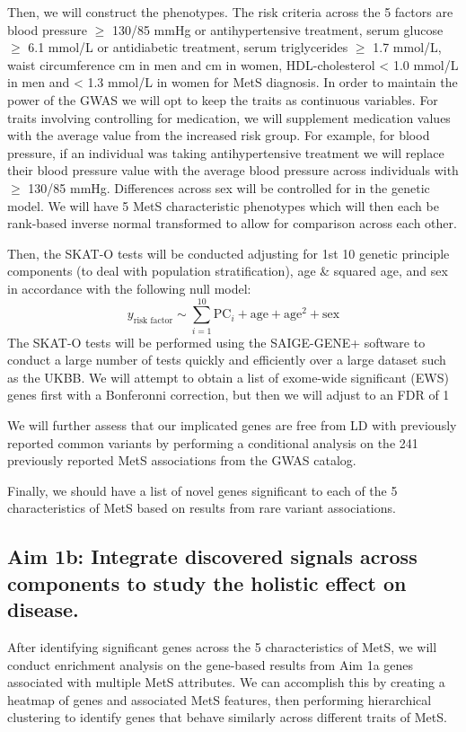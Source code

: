 \documentclass[11pt]{article}
\begin{document}
Then, we will construct the phenotypes. The risk criteria across the 5 factors are blood pressure $\ge$ 130/85 mmHg or antihypertensive treatment, serum glucose $\ge$ 6.1 mmol/L or antidiabetic treatment, serum triglycerides $\ge$ 1.7 mmol/L, waist circumference  cm in men and  cm in women, HDL-cholesterol < 1.0 mmol/L in men and < 1.3 mmol/L in women for MetS diagnosis. In order to maintain the power of the GWAS we will opt to keep the traits as continuous variables. For traits involving controlling for medication, we will supplement medication values with the average value from the increased risk group. For example, for blood pressure, if an individual was taking antihypertensive treatment we will replace their blood pressure value with the average blood pressure across individuals with $\ge$ 130/85 mmHg. Differences across sex will be controlled for in the genetic model. We will have 5 MetS characteristic phenotypes which will then each be rank-based inverse normal transformed to allow for comparison across each other.

Then, the SKAT-O tests will be conducted adjusting for 1st 10 genetic principle components (to deal with population stratification), age \& squared age, and sex in accordance with the following null model:
$$y_{\text{risk factor}} \sim \sum_{i=1}^{10} \text{PC}_i + \text{age} + \text{age}^2 + \text{sex}$$
The SKAT-O tests will be performed using the SAIGE-GENE+ software to conduct a large number of tests quickly and efficiently over a large dataset such as the UKBB. We will attempt to obtain a list of exome-wide significant (EWS) genes first with a Bonferonni correction, but then we will adjust to an FDR of 1%

We will further assess that our implicated genes are free from LD with previously reported common variants by performing a conditional analysis on the 241 previously reported MetS associations from the GWAS catalog.

Finally, we should have a list of novel genes significant to each of the 5 characteristics of MetS based on results from rare variant associations.


\subsection*{Aim 1b: Integrate discovered signals across components to study the holistic effect on disease.} 

After identifying significant genes across the 5 characteristics of MetS, we will conduct enrichment analysis on the gene-based results from Aim 1a genes associated with multiple MetS attributes. We can accomplish this by creating a heatmap of genes and associated MetS features, then performing hierarchical clustering to identify genes that behave similarly across different traits of MetS. 
\end{document}

